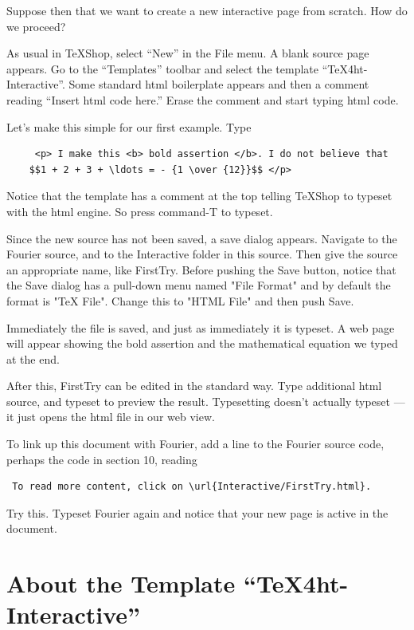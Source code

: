 \documentclass[11pt, oneside]{article}   	%
\begin{document}
Suppose then that we want to create a new interactive page from scratch. How do we proceed?
 
 As usual in TeXShop, select ``New'' in the File menu. A blank source page appears. Go to the ``Templates'' toolbar and select the template  ``TeX4ht-Interactive''. Some standard html boilerplate appears and then a comment reading ``Insert html code here.'' Erase the comment and start typing html code. 
 
 Let's make this  simple for our first example. Type
 \begin{verbatim}
     <p> I make this <b> bold assertion </b>. I do not believe that
    $$1 + 2 + 3 + \ldots = - {1 \over {12}}$$ </p>
 \end{verbatim}
 
 Notice that the template has a comment at the top telling TeXShop to typeset with the html engine. So press command-T to typeset. 
 
 Since the new source has not  been saved, a save dialog appears. Navigate to the Fourier source, and to the Interactive folder in this source. Then give the source an appropriate name, like FirstTry. Before pushing the Save button, notice that the Save dialog has a pull-down menu named "File Format" and by default the format is "TeX File". Change this to "HTML File" and then push Save.
 
 Immediately the file is saved, and just as immediately it is typeset. A web page will appear showing the bold assertion and the mathematical equation we typed at the end.
 
After this, FirstTry can be edited in the standard way. Type additional html source, and typeset to preview the result. Typesetting doesn't actually typeset --- it just opens the html file in our web view.
 
 To link up this document with Fourier,  add a line to the Fourier source code, perhaps the code in section 10, reading
 \begin{verbatim}
 To read more content, click on \url{Interactive/FirstTry.html}.
 \end{verbatim}
 
 Try this.  Typeset Fourier again and notice that your new page is active in the document.
 

 \section{About the Template ``TeX4ht-Interactive''}
 
\end{document}
